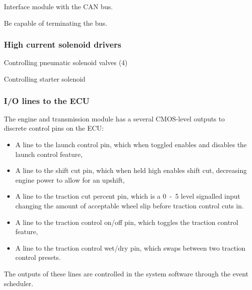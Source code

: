Interface module with the CAN bus.

Be capable of terminating the bus.


\subsubsection{High current solenoid drivers}


Controlling pneumatic solenoid valves (4)
  
Controlling starter solenoid


\subsubsection{I/O lines to the ECU}

The engine and transmission module has a several CMOS-level outputs to discrete control pins on the ECU:

\begin{itemize}
  \item A line to the launch control pin, which when toggled enables and disables the launch control feature,
  \item A line to the shift cut pin, which when held high enables shift cut, decreasing engine power to allow for an upshift,
  \item A line to the traction cut percent pin, which is a \unit{0-5}{\volt} level signalled input changing the amount of acceptable wheel slip before traction control cuts in.
  \item A line to the traction control on/off pin, which toggles the traction control feature,
  \item A line to the traction control wet/dry pin, which swaps between two traction control presets.
\end{itemize}

The outputs of these lines are controlled in the system software through the event scheduler. 